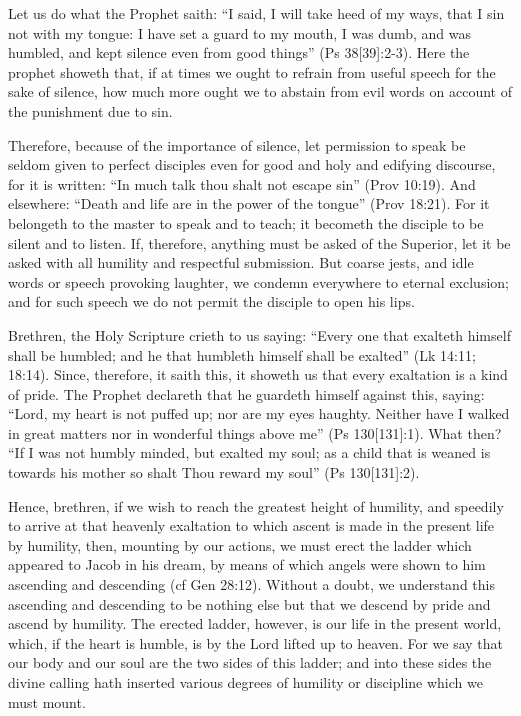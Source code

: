 
Let us do what the Prophet saith: ``I said, I will take heed of my ways, that I sin not with my tongue: I have set a guard to my mouth, I was dumb, and was humbled, and kept silence even from good things'' (Ps 38[39]:2-3). Here the prophet showeth that, if at times we ought to refrain from useful speech for the sake of silence, how much more ought we to abstain from evil words on account of the punishment due to sin.

Therefore, because of the importance of silence, let permission to speak be seldom given to perfect disciples even for good and holy and edifying discourse, for it is written: ``In much talk thou shalt not escape sin'' (Prov 10:19). And elsewhere: ``Death and life are in the power of the tongue'' (Prov 18:21). For it belongeth to the master to speak and to teach; it becometh the disciple to be silent and to listen. If, therefore, anything must be asked of the Superior, let it be asked with all humility and respectful submission. But coarse jests, and idle words or speech provoking laughter, we condemn everywhere to eternal exclusion; and for such speech we do not permit the disciple to open his lips.


Brethren, the Holy Scripture crieth to us saying: ``Every one that exalteth himself shall be humbled; and he that humbleth himself shall be exalted'' (Lk 14:11; 18:14). Since, therefore, it saith this, it showeth us that every exaltation is a kind of pride. The Prophet declareth that he guardeth himself against this, saying: ``Lord, my heart is not puffed up; nor are my eyes haughty. Neither have I walked in great matters nor in wonderful things above me'' (Ps 130[131]:1). What then? ``If I was not humbly minded, but exalted my soul; as a child that is weaned is towards his mother so shalt Thou reward my soul'' (Ps 130[131]:2).

Hence, brethren, if we wish to reach the greatest height of humility, and speedily to arrive at that heavenly exaltation to which ascent is made in the present life by humility, then, mounting by our actions, we must erect the ladder which appeared to Jacob in his dream, by means of which angels were shown to him ascending and descending (cf Gen 28:12). Without a doubt, we understand this ascending and descending to be nothing else but that we descend by pride and ascend by humility. The erected ladder, however, is our life in the present world, which, if the heart is humble, is by the Lord lifted up to heaven. For we say that our body and our soul are the two sides of this ladder; and into these sides the divine calling hath inserted various degrees of humility or discipline which we must mount.

